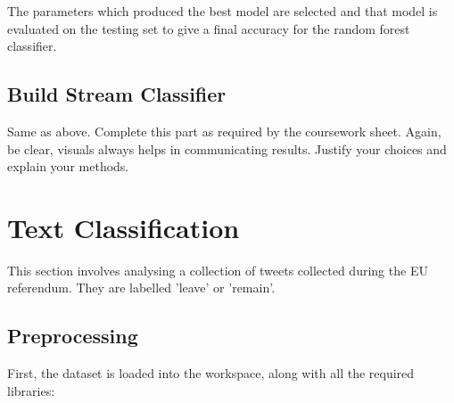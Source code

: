 \documentclass[10pt]{article}
\begin{document}
The parameters which produced the best model are selected and that model is evaluated on the testing set to give a final accuracy for the random forest classifier.
\begin{Schunk}
\end{Schunk}


\subsection{Build Stream Classifier}

Same as above. Complete this part as required by the coursework sheet. Again, be clear, visuals always helps in communicating results. Justify your choices and explain your methods. 




\section {Text Classification}

This section involves analysing a collection of tweets collected during the EU referendum. They are labelled 'leave' or 'remain'.



\subsection{Preprocessing}

First, the dataset is loaded into the workspace, along with all the required libraries:
\end{document}
